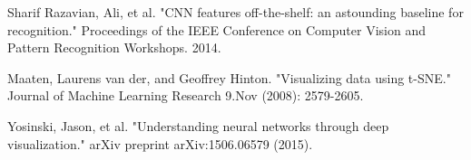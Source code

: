 \documentclass[journal, 10pt]{IEEEtran}
\begin{document}
\begin{thebibliography}{1}
    Sharif Razavian, Ali, et al. "CNN features off-the-shelf: an astounding baseline for recognition." Proceedings of the IEEE Conference on Computer Vision and Pattern Recognition Workshops. 2014.

    Maaten, Laurens van der, and Geoffrey Hinton. "Visualizing data using t-SNE." Journal of Machine Learning Research 9.Nov (2008): 2579-2605.

    Yosinski, Jason, et al. "Understanding neural networks through deep visualization." arXiv preprint arXiv:1506.06579 (2015).

\end{thebibliography}

%






\end{document}
